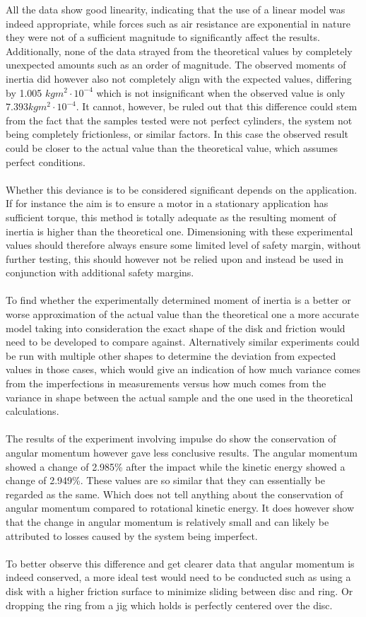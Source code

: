 \documentclass[11pt]{article}
\begin{document}
All the data show good linearity, indicating that the use of a linear model was indeed appropriate,
while forces such as air resistance are exponential in nature they were not of a sufficient magnitude
to significantly affect the results. Additionally, none of the data strayed from the theoretical values
by completely unexpected amounts such as an order of magnitude. The observed moments of inertia did 
however also not completely align with the expected values, differing by 1.005 $kgm^{2}\cdot 10^{-4}$ 
which is not insignificant when the observed value is only $7.393 kgm^{2}\cdot 10^{-4}$. It cannot, however,
be ruled out that this difference could stem from the fact that the samples tested were not perfect cylinders,
the system not being completely frictionless, or similar factors. In this case the observed result could be
closer to the actual value than the theoretical value, which assumes perfect conditions. 
\\\\
Whether this deviance is to be considered significant depends on the application. If for instance the aim is
to ensure a motor in a stationary application has sufficient torque, this method is totally adequate as the 
resulting moment of inertia is higher than the theoretical one. Dimensioning with these experimental values
should therefore always ensure some limited level of safety margin, without further testing, this should 
however not be relied upon and instead be used in conjunction with additional safety margins.
\\\\
To find whether the experimentally determined moment of inertia is a better or worse approximation of the actual
value than the theoretical one a more accurate model taking into consideration the exact shape of the disk and
friction would need to be developed to compare against. Alternatively similar experiments could be run with multiple
other shapes to determine the deviation from expected values in those cases, which would give an indication of
how much variance comes from the imperfections in measurements versus how much comes from the variance in shape between
the actual sample and the one used in the theoretical calculations.
\\\\
The results of the experiment involving impulse do show the conservation of angular momentum however gave less conclusive
results. The angular momentum showed a change of 2.985\% after the impact while the kinetic energy showed a change of 2.949\%.
These values are so similar that they can essentially be regarded as the same. Which does not tell anything about the conservation
of angular momentum compared to rotational kinetic energy. It does however show that the change in angular momentum is relatively small
and can likely be attributed to losses caused by the system being imperfect.
\\\\
To better observe this difference and get clearer data that angular momentum is indeed conserved, a more ideal test would need to be conducted
such as using a disk with a higher friction surface to minimize sliding between disc and ring. Or dropping the ring from a jig which holds
is perfectly centered over the disc.
\end{document}
